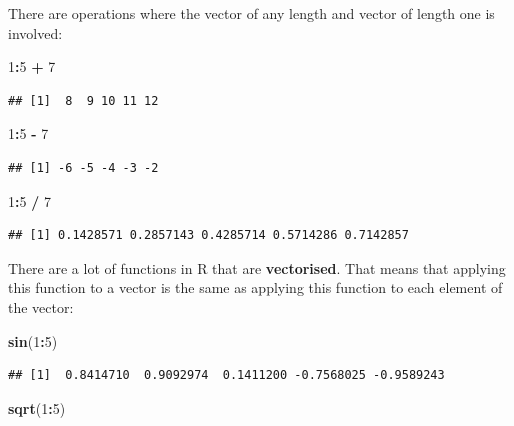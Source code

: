 \documentclass[
]{book}
\newenvironment{Shaded}{\begin{snugshade}}{\end{snugshade}}
\newcommand{\DecValTok}[1]{\textcolor[rgb]{0.00,0.00,0.81}{#1}}
\newcommand{\KeywordTok}[1]{\textcolor[rgb]{0.13,0.29,0.53}{\textbf{#1}}}
\newcommand{\NormalTok}[1]{#1}
\newcommand{\OperatorTok}[1]{\textcolor[rgb]{0.81,0.36,0.00}{\textbf{#1}}}
\newcommand{\StringTok}[1]{\textcolor[rgb]{0.31,0.60,0.02}{#1}}
\begin{document}
There are operations where the vector of any length and vector of length one is involved:

\begin{Shaded}
\begin{Highlighting}[]
\DecValTok{1}\OperatorTok{:}\DecValTok{5} \OperatorTok{+}\StringTok{ }\DecValTok{7}
\end{Highlighting}
\end{Shaded}

\begin{verbatim}
## [1]  8  9 10 11 12
\end{verbatim}

\begin{Shaded}
\begin{Highlighting}[]
\DecValTok{1}\OperatorTok{:}\DecValTok{5} \OperatorTok{-}\StringTok{ }\DecValTok{7}
\end{Highlighting}
\end{Shaded}

\begin{verbatim}
## [1] -6 -5 -4 -3 -2
\end{verbatim}

\begin{Shaded}
\begin{Highlighting}[]
\DecValTok{1}\OperatorTok{:}\DecValTok{5} \OperatorTok{/}\StringTok{ }\DecValTok{7}
\end{Highlighting}
\end{Shaded}

\begin{verbatim}
## [1] 0.1428571 0.2857143 0.4285714 0.5714286 0.7142857
\end{verbatim}

There are a lot of functions in R that are \textbf{vectorised}. That means that applying this function to a vector is the same as applying this function to each element of the vector:

\begin{Shaded}
\begin{Highlighting}[]
\KeywordTok{sin}\NormalTok{(}\DecValTok{1}\OperatorTok{:}\DecValTok{5}\NormalTok{)}
\end{Highlighting}
\end{Shaded}

\begin{verbatim}
## [1]  0.8414710  0.9092974  0.1411200 -0.7568025 -0.9589243
\end{verbatim}

\begin{Shaded}
\begin{Highlighting}[]
\KeywordTok{sqrt}\NormalTok{(}\DecValTok{1}\OperatorTok{:}\DecValTok{5}\NormalTok{)}
\end{Highlighting}
\end{Shaded}
\end{document}
